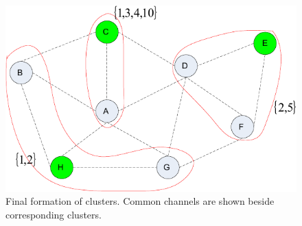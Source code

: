 \documentclass[10pt,journal,compsoc]{IEEEtran}
\theoremstyle{mytheoremstyle}
\theoremstyle{mytheoremstyle}
\theoremstyle{mytheoremstyle}
\begin{document}

\begin{figure}[h]
  \centering
  \includegraphics[width=0.5\linewidth]{final_clustering_ross.pdf}
  \caption{Final formation of clusters. Common channels are shown beside corresponding clusters.}
  \label{final_clustering_ross}
\end{figure}
\end{document}
